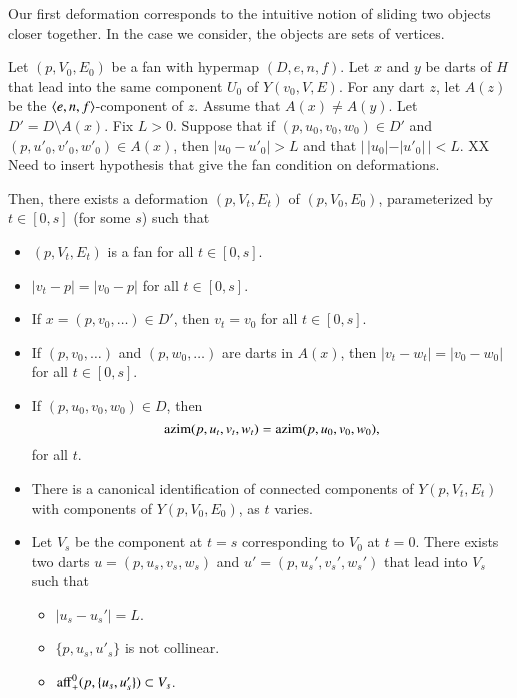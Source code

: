 
Our first deformation corresponds to the intuitive
notion of sliding two objects closer together.
In the case we consider, the objects are sets of vertices.

\begin{lemma} Let $(p,V_0,E_0)$ be a fan with hypermap $(D,e,n,f)$.
Let $x$ and $y$ be darts of $H$ that lead into the same
component $U_0$ of $Y(v_0,V,E)$.  For any dart $z$, let $A(z)$
be the $\langle e,n,f\rangle$-component of $z$.
Assume that $A(x)\ne A(y)$.
Let $D' = D\setminus A(x)$.  
Fix $L>0$.
Suppose that if $(p,u_0,v_0,w_0)\in D'$ and
$(p,u'_0,v'_0,w'_0)\in A(x)$, then $|u_0-u'_0|>L$ and
that $|\,|u_0| - |u'_0|\,| < L$.
XX Need to insert hypothesis that give the fan condition
on deformations.

Then, there exists a deformation
$(p,V_t,E_t)$ of $(p,V_0,E_0)$, 
parameterized by $t\in[0,s]$ (for some $s$) 
such that
\begin{itemize}
\item $(p,V_t,E_t)$ is a fan for all $t\in[0,s]$.
\item $|v_t-p| = |v_0-p|$ for all $t\in[0,s]$.
\item If $x=(p,v_0,\ldots)\in D'$, then $v_t=v_0$ for all $t\in[0,s]$.
\item If $(p,v_0,\ldots)$ and $(p,w_0,\ldots)$ are darts
in $A(x)$, then $|v_t-w_t|=|v_0-w_0|$ for all $t\in[0,s]$.
\item If $(p,u_0,v_0,w_0)\in D$, then 
   $$
   {\operatorname{azim}}(p,u_t,v_t,w_t) = {\operatorname{azim}}(p,u_0,v_0,w_0),
   $$
   for all $t$.
\item There is a canonical identification of connected components
of $Y(p,V_t,E_t)$ with components of $Y(p,V_0,E_0)$, as $t$ varies.
\item 
Let $V_s$ be the component at $t=s$ corresponding to $V_0$ at $t=0$.
There exists two darts $u=(p,u_s,v_s,w_s)$ and
$u'=(p,u_s',v_s',w_s')$ that lead into $V_s$ such that
  \begin{itemize} %
  \item $|u_s-u_s'| = L$.
  \item $\{p,u_s,u'_s\}$ is not collinear.
  \item ${\operatorname{aff}}_+^0(p,\{u_s,u_s'\}) \subset V_s$.
  \end{itemize} %
\end{itemize}
\end{lemma}

